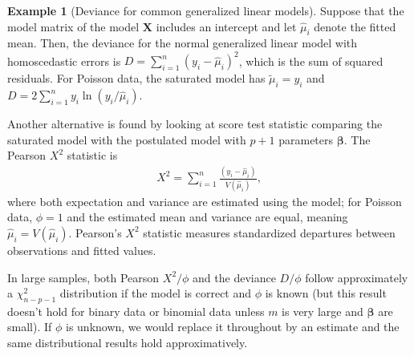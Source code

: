 \documentclass[
  11pt,
  letterpaper,
]{book}
\theoremstyle{definition}
\theoremstyle{definition}
\newtheorem{example}{Example}[chapter]
\theoremstyle{definition}
\theoremstyle{remark}
\begin{document}
\begin{example}[Deviance for common generalized linear models]
\protect\hypertarget{exm:devglm}{}{\label{exm:devglm} {} }Suppose that the model matrix of the model \(\mathbf{X}\) includes an intercept and let \(\widehat{\mu}_i\) denote the fitted mean. Then, the deviance for the normal generalized linear model with homoscedastic errors is \(D = \sum_{i=1}^n (y_i - \widehat{\mu}_i)^2\), which is the sum of squared residuals. For Poisson data, the saturated model has \(\widetilde{\mu}_i=y_i\) and \(D= 2\sum_{i=1}^n y_i \ln(y_i/\widehat{\mu}_i)\).
\end{example}

Another alternative is found by looking at score test statistic
comparing the saturated model with the postulated model with \(p+1\)
parameters \(\boldsymbol{\beta}\). The Pearson \(X^2\) statistic is
\begin{align*}
 X^2= \sum_{i=1}^n \frac{(y_i-\widehat{\mu}_i)}{ V(\widehat{\mu}_i)},
\end{align*}
where both expectation and variance are estimated using the
model; for Poisson data, \(\phi=1\) and the estimated mean and variance
are equal, meaning \(\widehat{\mu}_i=V(\widehat{\mu}_i)\). Pearson's \(X^2\)
statistic measures standardized departures between observations and
fitted values.

In large samples, both Pearson \(X^2/\phi\) and the deviance \(D/\phi\)
follow approximately a \(\chi^2_{n-p-1}\) distribution if the model is
correct and \(\phi\) is known (but this result doesn't hold for binary
data or binomial data unless \(m\) is very large and \(\boldsymbol{\beta}\)
are small). If \(\phi\) is unknown, we would replace it throughout by an
estimate and the same distributional results hold approximatively.
\end{document}
